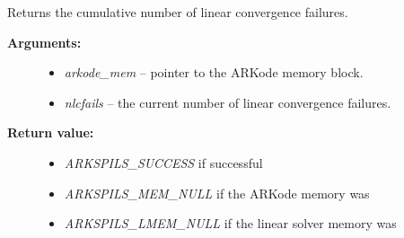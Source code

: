 \documentclass[letterpaper,10pt,english]{sphinxmanual}
\begin{document}
\begin{fulllineitems}
\label{c_interface/User_callable:ARKSpilsGetNumConvFails}
Returns the cumulative number of linear convergence failures.
\begin{description}
\item[{\textbf{Arguments:}}] \leavevmode\begin{itemize}
\item {} 
\emph{arkode\_mem} -- pointer to the ARKode memory block.

\item {} 
\emph{nlcfails} -- the current number of linear convergence failures.

\end{itemize}

\item[{\textbf{Return value:}}] \leavevmode\begin{itemize}
\item {} 
\emph{ARKSPILS\_SUCCESS} if successful

\item {} 
\emph{ARKSPILS\_MEM\_NULL} if the ARKode memory was 

\item {} 
\emph{ARKSPILS\_LMEM\_NULL} if the linear solver memory was 

\end{itemize}

\end{description}

\end{fulllineitems}

\end{document}
